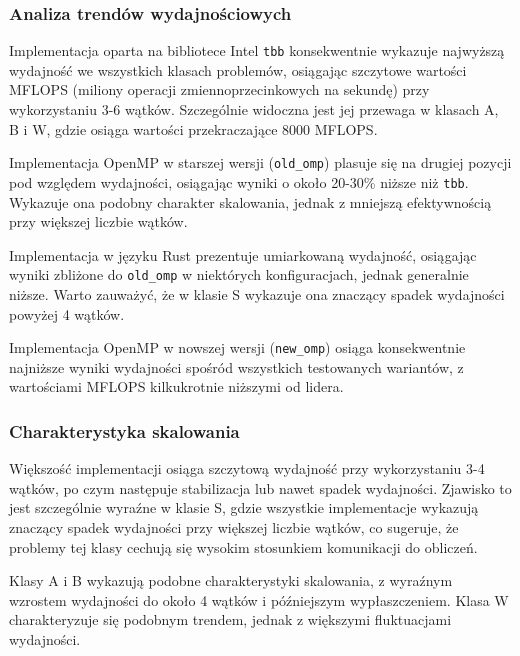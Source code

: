 \subsubsection{Analiza trendów wydajnościowych}
Implementacja oparta na bibliotece Intel \texttt{tbb} konsekwentnie wykazuje najwyższą wydajność we wszystkich klasach problemów, osiągając szczytowe wartości MFLOPS (miliony operacji zmiennoprzecinkowych na sekundę) przy wykorzystaniu 3-6 wątków. Szczególnie widoczna jest jej przewaga w klasach A, B i W, gdzie osiąga wartości przekraczające 8000 MFLOPS.

Implementacja OpenMP w starszej wersji (\texttt{old\_omp}) plasuje się na drugiej pozycji pod względem wydajności, osiągając wyniki o około 20-30\% niższe niż \texttt{tbb}. Wykazuje ona podobny charakter skalowania, jednak z mniejszą efektywnością przy większej liczbie wątków.

Implementacja w języku Rust prezentuje umiarkowaną wydajność, osiągając wyniki zbliżone do \texttt{old\_omp} w niektórych konfiguracjach, jednak generalnie niższe. Warto zauważyć, że w klasie S wykazuje ona znaczący spadek wydajności powyżej 4 wątków.

Implementacja OpenMP w nowszej wersji (\texttt{new\_omp}) osiąga konsekwentnie najniższe wyniki wydajności spośród wszystkich testowanych wariantów, z wartościami MFLOPS kilkukrotnie niższymi od lidera.

\subsubsection{Charakterystyka skalowania}
Większość implementacji osiąga szczytową wydajność przy wykorzystaniu 3-4 wątków, po czym następuje stabilizacja lub nawet spadek wydajności. Zjawisko to jest szczególnie wyraźne w klasie S, gdzie wszystkie implementacje wykazują znaczący spadek wydajności przy większej liczbie wątków, co sugeruje, że problemy tej klasy cechują się wysokim stosunkiem komunikacji do obliczeń.

Klasy A i B wykazują podobne charakterystyki skalowania, z wyraźnym wzrostem wydajności do około 4 wątków i późniejszym wypłaszczeniem. Klasa W charakteryzuje się podobnym trendem, jednak z większymi fluktuacjami wydajności.

